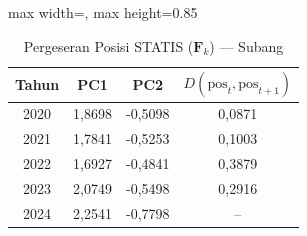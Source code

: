 \begin{table}[H]
\centering
\caption{Pergeseran Posisi STATIS ($\mathbf{F}_k$) --- Subang} \label{tab:app2jarak_statis_skor_subang}
\begin{adjustbox}{max width=\textwidth, max height=0.85\textheight}
\begin{tabular}{|c|c|c|c|}
\hline
\textbf{Tahun} & \textbf{PC1} & \textbf{PC2} & \textbf{$D(\text{pos}_t, \text{pos}_{t+1})$} \\
\hline
2020 & 1,8698 & -0,5098 & 0,0871 \\
2021 & 1,7841 & -0,5253 & 0,1003 \\
2022 & 1,6927 & -0,4841 & 0,3879 \\
2023 & 2,0749 & -0,5498 & 0,2916 \\
2024 & 2,2541 & -0,7798 & -- \\
\hline
\end{tabular}
\end{adjustbox}
\end{table}